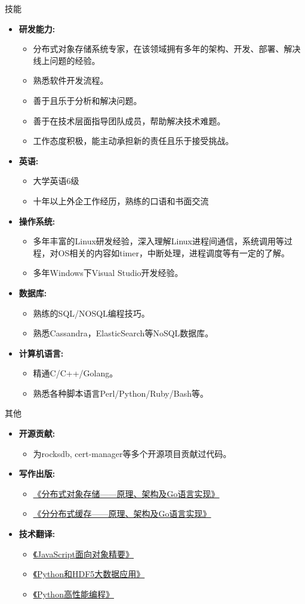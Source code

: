 \documentclass[11pt,oneside]{article}
\newenvironment{ressection}[1]{
	\vspace{4pt}
	{\selectfont\Large#1}
	\begin{itemize}
	\vspace{3pt}
}{
	\end{itemize}
}
\newcommand{\resitem}[1]{
	\vspace{-4pt}
	\item \begin{flushleft} #1 \end{flushleft}
}
\newcommand{\ressubitem}[1]{
	\vspace{-1pt}
	\item \begin{flushleft} #1 \end{flushleft}
}
\newenvironment{reslist}[1]{
	\resitem{\textbf{#1}}
	\vspace{-5pt}
	\begin{itemize}
}{
	\end{itemize}
}
\begin{document}
\begin{CJK}{UTF8}{gkai}
\begin{ressection}{技能}
	\begin{reslist}{研发能力:}
		\ressubitem{分布式对象存储系统专家，在该领域拥有多年的架构、开发、部署、解决线上问题的经验。}
		\ressubitem{熟悉软件开发流程。}
		\ressubitem{善于且乐于分析和解决问题。}
		\ressubitem{善于在技术层面指导团队成员，帮助解决技术难题。}
		\ressubitem{工作态度积极，能主动承担新的责任且乐于接受挑战。}
	\end{reslist}

	\begin{reslist}{英语:}
		\ressubitem{大学英语6级}
		\ressubitem{十年以上外企工作经历，熟练的口语和书面交流}
	\end{reslist}

	\begin{reslist}{操作系统:}
		\ressubitem{多年丰富的Linux研发经验，深入理解Linux进程间通信，系统调用等过程，对OS相关的内容如timer，中断处理，进程调度等有一定的了解。}
		\ressubitem{多年Windows下Visual Studio开发经验。}
	\end{reslist}

	\begin{reslist}{数据库:}
		\ressubitem{熟练的SQL/NOSQL编程技巧。}
		\ressubitem{熟悉Cassandra，ElasticSearch等NoSQL数据库。}
	\end{reslist}

	\begin{reslist}{计算机语言:}
		\ressubitem{精通C/C++/Golang。}
		\ressubitem{熟悉各种脚本语言Perl/Python/Ruby/Bash等。}
	\end{reslist}

\end{ressection}

\begin{ressection}{其他}

	\begin{reslist}{开源贡献:}
		\ressubitem{为rocksdb, cert-manager等多个开源项目贡献过代码。}
	\end{reslist}

	\begin{reslist}{写作出版:}
		\ressubitem{\href{https://item.jd.com/60796801160.html}{《分布式对象存储——原理、架构及Go语言实现》}}
		\ressubitem{\href{https://item.jd.com/12495484.html}{《分分布式缓存——原理、架构及Go语言实现》}}
	\end{reslist}

	\begin{reslist}{技术翻译:}
		\ressubitem{\href{https://www.epubit.com/book/detail/33175}{《JavaScript面向对象精要》}}
		\ressubitem{\href{https://www.epubit.com/book/detail/15126}{《Python和HDF5大数据应用》}}
		\ressubitem{\href{https://www.epubit.com/book/detail/14722}{《Python高性能编程》}}
	\end{reslist}

\end{ressection}
\end{CJK}
\end{document}
